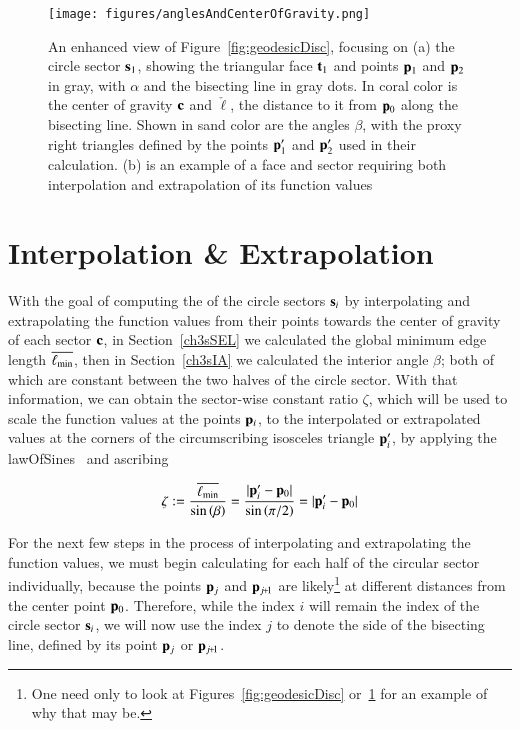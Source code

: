 \begin{figure}[ht]
\ffigbox
	{\texttt{[image: figures/anglesAndCenterOfGravity.png]}}
	{\caption[An Enhanced View of a Circle Sector]{An enhanced view of Figure~\ref{fig:geodesicDisc}, focusing on (a) the circle sector $\mathbf{s}_1$, showing the triangular face $\mathbf{t}_1$ and points $\mathbf{p}_1$ and $\mathbf{p}_2$ in gray, with $\alpha$ and the bisecting line in gray dots. In coral color is the center of gravity $\mathbf{c}$ and $\check{\ell}$, the distance to it from $\mathbf{p}_0$ along the bisecting line. Shown in sand color are the angles $\beta$, with the proxy right triangles defined by the points $\mathbf{p}'_1$ and $\mathbf{p}'_2$ used in their calculation. (b) is an example of a face and sector requiring both interpolation and extrapolation of its function values}\label{fig:anglesAndCenterOfGravity}}
\end{figure}%

%
%
%
%
\section{Interpolation \& Extrapolation}
\label{ch3sIE}
With the goal of computing the  of the circle sectors $\mathbf{s}_i$ by interpolating and extrapolating the function values from their points towards the center of gravity of each sector $\mathbf{c}$, in Section~\ref{ch3sSEL} we calculated the global minimum edge length $\overline{\ell_\text{min}}$, then in Section~\ref{ch3sIA} we calculated the interior angle $\beta$; both of which are constant between the two halves of the circle sector. With that information, we can obtain the sector-wise constant ratio $\zeta$, which will be used to scale the function values at the points $\mathbf{p}_i$, to the interpolated or extrapolated values at the corners of the circumscribing isosceles triangle $\mathbf{p}'_i$, by applying the \gls{lawOfSines}~\cite{Weisstein19g} and ascribing

\begin{equation}
	\zeta := \frac{\overline{\ell_\text{min}}}{\sin\left (\beta\right )} = \frac{|\mathbf{p}'_i - \mathbf{p}_0|}{\sin\left (\pi/2\right )} = |\mathbf{p}'_i - \mathbf{p}_0|
	\label{eq:zeta}
\end{equation}%
%

For the next few steps in the process of interpolating and extrapolating the function values, we must begin calculating for each half of the circular sector individually, because the points $\mathbf{p}_j$ and $\bp_{\sjpo}$ are likely\footnote{One need only to look at Figures~\ref{fig:geodesicDisc} or~\ref{fig:anglesAndCenterOfGravity} for an example of why that may be.} at different distances from the center point $\mathbf{p}_0$. Therefore, while the index $i$ will remain the index of the circle sector $\mathbf{s}_i$, we will now use the index $j$ to denote the side of the bisecting line, defined by its point $\mathbf{p}_j$ or $\bp_{\sjpo}$.

